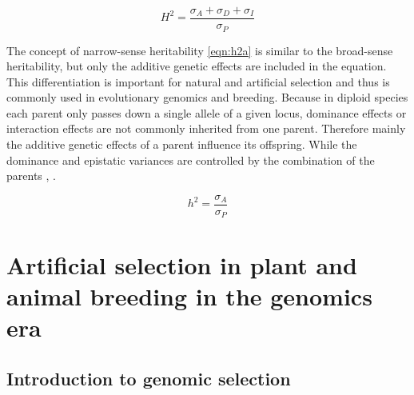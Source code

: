 \begin{equation}
 H^2 = \frac{\sigma_{A} + \sigma_{D} + \sigma_{I}}{\sigma_{P}}
 \label{eqn:h2G}
\end{equation}

The concept of narrow-sense heritability \ref{eqn:h2a} is similar to the broad-sense
heritability, but only the additive genetic effects are included in the equation. This
differentiation is important for natural and artificial selection and thus is commonly used
in evolutionary genomics and breeding. Because in diploid species each parent only passes
down a single allele of a given locus, dominance effects or interaction effects are
not commonly inherited from one parent. Therefore mainly the additive genetic effects of a
parent influence its offspring. While the dominance and epistatic variances are controlled
by the combination of the parents \cite{falconer1996}, \cite{walsh2018}.

\begin{equation}
  h^2 = \frac{\sigma_{A}}{\sigma_{P}}
 \label{eqn:h2a}
\end{equation}

\section{Artificial selection in plant and animal breeding in the genomics era}
\subsection{Introduction to genomic selection } \label{intro:gs}

